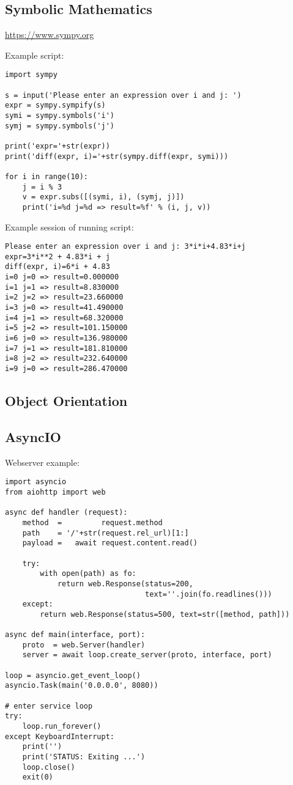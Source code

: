 \subsection{Symbolic Mathematics}

\url{https://www.sympy.org}

Example script:
\begin{verbatim}
import sympy

s = input('Please enter an expression over i and j: ')
expr = sympy.sympify(s)
symi = sympy.symbols('i')
symj = sympy.symbols('j')

print('expr='+str(expr))
print('diff(expr, i)='+str(sympy.diff(expr, symi)))

for i in range(10):
    j = i % 3
    v = expr.subs([(symi, i), (symj, j)])
    print('i=%d j=%d => result=%f' % (i, j, v))
\end{verbatim}

Example session of running script:
\begin{verbatim}
Please enter an expression over i and j: 3*i*i+4.83*i+j 
expr=3*i**2 + 4.83*i + j
diff(expr, i)=6*i + 4.83
i=0 j=0 => result=0.000000
i=1 j=1 => result=8.830000
i=2 j=2 => result=23.660000
i=3 j=0 => result=41.490000
i=4 j=1 => result=68.320000
i=5 j=2 => result=101.150000
i=6 j=0 => result=136.980000
i=7 j=1 => result=181.810000
i=8 j=2 => result=232.640000
i=9 j=0 => result=286.470000
\end{verbatim}

\subsection{Object Orientation}

\subsection{AsyncIO}

Webserver example:
\begin{verbatim}
import asyncio
from aiohttp import web

async def handler (request):
    method  =         request.method
    path    = '/'+str(request.rel_url)[1:]
    payload =   await request.content.read()
    
    try:
        with open(path) as fo:
            return web.Response(status=200, 
                                text=''.join(fo.readlines()))
    except:
        return web.Response(status=500, text=str([method, path]))

async def main(interface, port):
    proto  = web.Server(handler)
    server = await loop.create_server(proto, interface, port)

loop = asyncio.get_event_loop()
asyncio.Task(main('0.0.0.0', 8080))

# enter service loop
try:
    loop.run_forever()
except KeyboardInterrupt:
    print('')
    print('STATUS: Exiting ...')
    loop.close()
    exit(0)
\end{verbatim}
